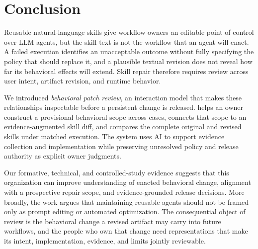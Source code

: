 \section{Conclusion}
\label{sec:conclusion}

Reusable natural-language skills give workflow owners an editable point of
control over LLM agents, but the skill text is not the workflow that an agent
will enact. A failed execution identifies an unacceptable outcome without
fully specifying the policy that should replace it, and a plausible textual
revision does not reveal how far its behavioral effects will extend. Skill
repair therefore requires review across user intent, artifact revision, and
runtime behavior.

We introduced \emph{behavioral patch review}, an interaction model that makes
these relationships inspectable before a persistent change is released.
\systemname{} helps an owner construct a provisional behavioral scope across
cases, connects that scope to an evidence-augmented skill diff, and compares
the complete original and revised skills under matched execution. The system
uses AI to support evidence collection and implementation while preserving
unresolved policy and release authority as explicit owner judgments.

Our formative, technical, and controlled-study evidence suggests that this
organization can improve understanding of enacted behavioral change, alignment
with a prospective repair scope, and evidence-grounded release decisions. More
broadly, the work argues that maintaining reusable agents should not be framed
only as prompt editing or automated optimization. The consequential object of
review is the behavioral change a revised artifact may carry into future
workflows, and the people who own that change need representations that make
its intent, implementation, evidence, and limits jointly reviewable.
